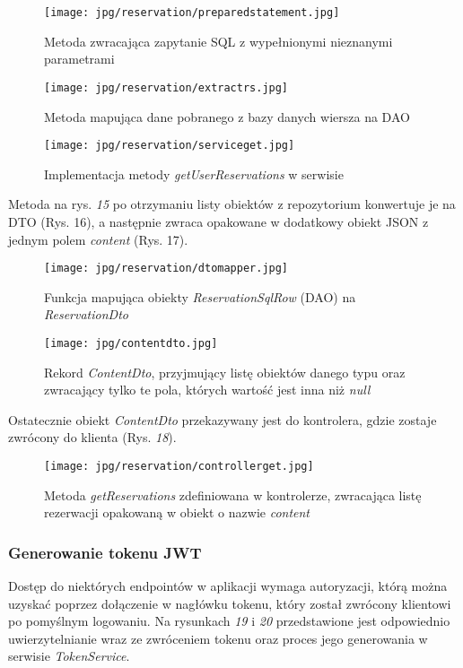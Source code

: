 \documentclass[11pt,a4paper]{article}
\begin{document}
\begin{figure}[H]
    \centering
    \texttt{[image: jpg/reservation/preparedstatement.jpg]}
    \caption{Metoda zwracająca zapytanie SQL z wypełnionymi nieznanymi parametrami}
\end{figure}

\begin{figure}[H]
    \centering
    \texttt{[image: jpg/reservation/extractrs.jpg]}
    \caption{Metoda mapująca dane pobranego z bazy danych wiersza na DAO}
\end{figure}

\begin{figure}[H]
    \centering
    \texttt{[image: jpg/reservation/serviceget.jpg]}
    \caption{Implementacja metody \textsl{getUserReservations} w serwisie}
\end{figure}

\noindent
Metoda na rys. \textsl{15} po otrzymaniu listy obiektów z repozytorium konwertuje je na DTO (Rys. 16), a następnie zwraca opakowane w dodatkowy obiekt JSON z jednym polem \textsl{content} (Rys. 17).

\begin{figure}[H]
    \centering
    \texttt{[image: jpg/reservation/dtomapper.jpg]}
    \caption{Funkcja mapująca obiekty \textsl{ReservationSqlRow} (DAO) na \textsl{ReservationDto}}
\end{figure}

\begin{figure}[H]
    \centering
    \texttt{[image: jpg/contentdto.jpg]}
    \caption{Rekord \textsl{ContentDto}, przyjmujący listę obiektów danego typu oraz zwracający tylko te pola, których wartość jest inna niż \textsl{null}}
\end{figure}

\noindent
Ostatecznie obiekt \textsl{ContentDto} przekazywany jest do kontrolera, gdzie zostaje zwrócony do klienta (Rys. \textsl{18}).

\begin{figure}[H]
    \centering
    \texttt{[image: jpg/reservation/controllerget.jpg]}
    \caption{Metoda \textsl{getReservations} zdefiniowana w kontrolerze, zwracająca listę rezerwacji opakowaną w obiekt o nazwie \textsl{content}}
\end{figure}

\subsubsection{Generowanie tokenu JWT}
Dostęp do niektórych endpointów w aplikacji wymaga autoryzacji, którą można uzyskać poprzez dołączenie w nagłówku tokenu, który został zwrócony klientowi po pomyślnym logowaniu. Na rysunkach \textsl{19} i \textsl{20} przedstawione jest odpowiednio uwierzytelnianie wraz ze zwróceniem tokenu oraz proces jego generowania w serwisie \textsl{TokenService}.
\end{document}
